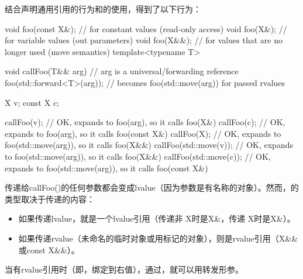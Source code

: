 结合声明通用引用的行为和的使用，得到了以下行为：

\begin{cppcode}
void foo(const X&); // for constant values (read-only access)
void foo(X&); // for variable values (out parameters)
void foo(X&&); // for values that are no longer used (move semantics)
template<typename T>

void callFoo(T&& arg) { // arg is a universal/forwarding reference
	foo(std::forward<T>(arg)); // becomes foo(std::move(arg)) for passed rvalues
}

X v;
const X c;

callFoo(v); // OK, expands to foo(arg), so it calls foo(X&)
callFoo(c); // OK, expands to foo(arg), so it calls foo(const X&)
callFoo(X{}); // OK, expands to foo(std::move(arg)), so it calls foo(X&&)
callFoo(std::move(v)); // OK, expands to foo(std::move(arg)), so it calls foo(X&&)
callFoo(std::move(c)); // OK, expands to foo(std::move(arg)), so it calls foo(const X&)
\end{cppcode}

传递给callFoo()的任何参数都会变成lvalue（因为参数是有名称的对象）。然而，的类型取决于传递的内容：

\begin{itemize}
	\item 如果传递lvalue，就是一个lvalue引用（传递非 X时是X\&，传递 X时是X\&）。
	\item 如果传递rvalue（未命名的临时对象或用标记的对象），则是rvalue引用（X\&\&或const X\&\&）。
\end{itemize}

当有rvalue引用时（即，绑定到右值），通过，就可以用转发形参。





















